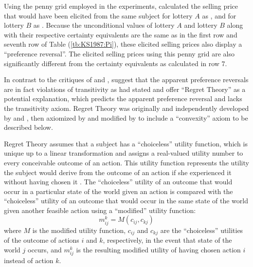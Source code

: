 \documentclass[../main.tex]{subfiles}
\begin{document}
Using the penny grid employed in the \textcite{Grether1979} experiments, \textcite[680]{Karni1987} calculated the selling price that would have been elicited from the same subject for lottery $A$ as , and for lottery $B$ as .
Because the unconditional values of lottery $A$ and lottery $B$ along with their respective certainty equivalents are the same as in the first row and seventh row of Table (\ref{tb:KS1987:Pi}), these elicited selling prices also display a \enquote{preference reversal}.
The elicited selling prices using this penny grid are also significantly different from the certainty equivalents as calculated in row 7.

In contrast to the critiques of \textcite{Holt1986} and \textcite{Karni1987}, \textcite{Loomes1989} suggest that the apparent preference reversals are in fact violations of transitivity as \textcite[623]{Grether1979} had stated and offer \enquote{Regret Theory} as a potential explanation, which predicts the apparent preference reversal and lacks the transitivity axiom.
Regret Theory was originally and independently developed by \textcite{Loomes1982} and \textcite{Bell1982}, then axiomized by \textcite{Fishburn1987} and modified by \textcite{Loomes1987} to include a \enquote{convexity} axiom to be described below.

Regret Theory assumes that a subject has a \enquote{choiceless} utility function, which is unique up to a linear transformation and assigns a real-valued utility number to every conceivable outcome of an action.
This utility function represents the utility the subject would derive from the outcome of an action if she experienced it without having chosen it \parencite[807]{Loomes1987}.
The \enquote{choiceless} utility of an outcome that would occur in a particular state of the world given an action is compared with the \enquote{choiceless} utility of an outcome that would occur in the same state of the world given another feasible action using a \enquote{modified} utility function:
\begin{equation}
	\label{eq:LS1987:mu}
	m^k_{ij} = M( c_{ij} , c_{kj} )
\end{equation}
\noindent where $M$ is the modified utility function, $c_{ij}$ and $c_{kj}$ are the \enquote{choiceless} utilities of the outcome of actions $i$ and $k$, respectively, in the event that state of the world $j$ occurs, and $m^k_{ij}$ is the resulting modified utility of having chosen action $i$ instead of action $k$.
\end{document}
